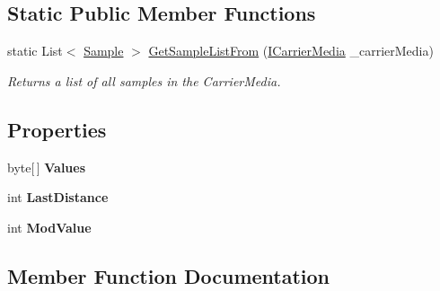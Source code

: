 \subsection*{Static Public Member Functions}
\begin{DoxyCompactItemize}
\item 
static List$<$ \hyperlink{class_stegosaurus_1_1_algorithm_1_1_common_sample_1_1_sample}{Sample} $>$ \hyperlink{class_stegosaurus_1_1_algorithm_1_1_common_sample_1_1_sample_ae8e05cc119668551b2dc015a1970263f}{Get\+Sample\+List\+From} (\hyperlink{interface_stegosaurus_1_1_carrier_1_1_i_carrier_media}{I\+Carrier\+Media} \+\_\+carrier\+Media)
\begin{DoxyCompactList}\small\item\em Returns a list of all samples in the Carrier\+Media. \end{DoxyCompactList}\end{DoxyCompactItemize}
\subsection*{Properties}
\begin{DoxyCompactItemize}
\item 
byte\mbox{[}$\,$\mbox{]} {\bfseries Values}\hypertarget{class_stegosaurus_1_1_algorithm_1_1_common_sample_1_1_sample_ab71c1b7401e42157082d56ee63e17418}{}\label{class_stegosaurus_1_1_algorithm_1_1_common_sample_1_1_sample_ab71c1b7401e42157082d56ee63e17418}

\item 
int {\bfseries Last\+Distance}\hypertarget{class_stegosaurus_1_1_algorithm_1_1_common_sample_1_1_sample_abff4b45f44853f8b61e119c2275008be}{}\label{class_stegosaurus_1_1_algorithm_1_1_common_sample_1_1_sample_abff4b45f44853f8b61e119c2275008be}

\item 
int {\bfseries Mod\+Value}\hypertarget{class_stegosaurus_1_1_algorithm_1_1_common_sample_1_1_sample_a385371615d5aa1cefd12648f7b4d4f1e}{}\label{class_stegosaurus_1_1_algorithm_1_1_common_sample_1_1_sample_a385371615d5aa1cefd12648f7b4d4f1e}

\end{DoxyCompactItemize}


\subsection{Member Function Documentation}
